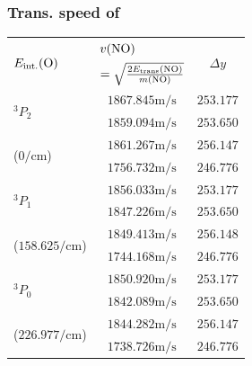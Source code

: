 \documentclass[aspectratio=43,scheme=plain]{ctexbeamer}
\begin{document}
	\subsubsection{Trans. speed of }
	\begin{frame}{\insertsubsection}{\insertsubsubsection}
\begin{table}[htbp]  
	\centering  
	\tiny   
	\begin{tabular}{l|cc}    
		\toprule
		\multicolumn{1}{l}{\multirow{2}[1]{*}{$E_\text{int.}(\ce{O})$}} & \multicolumn{1}{l}{$v(\ce{NO}) $} & \multirow{2}[1]{*}{$\Delta y $} \\    
		\multicolumn{1}{l}{} & \multicolumn{1}{l}{$= \sqrt {  \frac{2E_\text{trans}(\ce{NO})}{m(\ce{NO})}   }$} &  \\    
		\midrule
		\multirow{2}[1]{*}{$^3 P_2$} & $1867.845 \unit{\meter \per \second}$ & $253.177$ \\          
		& $1859.094 \unit{\meter \per \second}$ & $253.650$ \\    
		\multirow{2}[1]{*}{($\num{0}\unit{\per \centi \meter}$)} & $1861.267 \unit{\meter \per \second}$ & $256.147$ \\          
		& $1756.732 \unit{\meter \per \second}$ & $246.776$ \\    
		\midrule    
		\multirow{2}[1]{*}{$^3 P_1$} & $1856.033 \unit{\meter \per \second}$ & $253.177$ \\          
		& $1847.226 \unit{\meter \per \second}$ & $253.650$ \\    
		\multirow{2}[1]{*}{($\num{158.625}\unit{\per \centi \meter}$)} & $1849.413 \unit{\meter \per \second}$ & $256.148$ \\          
		& $1744.168 \unit{\meter \per \second}$ & $246.776$ \\    
		\midrule    
		\multirow{2}[1]{*}{$^3 P_0$} & $1850.920 \unit{\meter \per \second}$ & $253.177$ \\          
		& $1842.089 \unit{\meter \per \second}$ & $253.650$ \\    
		\multirow{2}[1]{*}{($\num{226.977}\unit{\per \centi \meter}$)} & $1844.282 \unit{\meter \per \second}$ & $256.147$ \\          
		& $1738.726 \unit{\meter \per \second}$ & $246.776$ \\    		
		\bottomrule    
		\end{tabular}
	\end{table}%
\end{frame}
\end{document}
